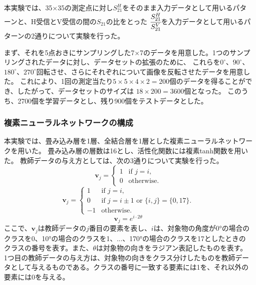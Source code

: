 \documentclass[11pt,a4paper,uplatex]{ujarticle}
\begin{document}
  本実験では、35×35の測定点に対し$S_{21}^{H}$をそのまま入力データとして用いるパターンと、H受信とV受信の間の$S_{21}$の比をとった
  $\cfrac{S_{21}^{H}}{S_{21}^{V}}$を入力データとして用いるパターンの2通りについて実験を行った。

  まず、それを5点おきにサンプリングした7×7のデータを用意した。1つのサンプリングされたデータに対し、データセットの拡張のために、
  これらを$0^\circ$、$90^\circ$、$180^\circ$、$270^\circ$回転させ、さらにそれぞれについて画像を反転させたデータを用意した。
  これにより、1回の測定当たり$5\times 5 \times 4 \times 2 = 200$個のデータを得ることができ、したがって、データセットのサイズは
  $18\times 200 = 3600$個となった。
  このうち、2700個を学習データとし、残り900個をテストデータとした。
  
  \subsubsection{複素ニューラルネットワークの構成}
  本実験では、畳み込み層を1層、全結合層を1層とした複素ニューラルネットワークを用いた。
  畳み込み層の層数は16とし、活性化関数には複素tanh関数を用いた。
  教師データの与え方としては、次の3通りについて実験を行った。
  \begin{equation}\label{eq:onehot}
    \mathbf{v}_j =
    \begin{cases}
        1 & \text{if } j = i, \\
        0 & \text{otherwise}.
    \end{cases}
  \end{equation}
  \begin{equation}\label{eq:soft}
    \mathbf{v}_j =
    \begin{cases}
        1 & \text{if } j = i, \\
        0 & \text{if } j = i \pm 1 \text{ or } \{i, j\} = \{0, 17\}.\\
        -1 & \text{otherwise}.
    \end{cases}
  \end{equation}
  \begin{equation}\label{eq:circular}
    \mathbf{v}_j = e^{i\cdot2\theta}
  \end{equation}
  ここで、$\mathbf{v}_j$は教師データの$j$番目の要素を表し、$i$は、対象物の角度が0°の場合のクラスを0、10°の場合のクラスを1、...、170°の場合のクラスを17としたときの
  クラスの番号を表す。また、$\theta$は対象物の向きをラジアン表記したものを表す。
  1つ目の教師データの与え方は、対象物の向きをクラス分けしたものを教師データとして与えるものである。クラスの番号に一致する要素には1を、それ以外の要素には0を与える。
\end{document}
